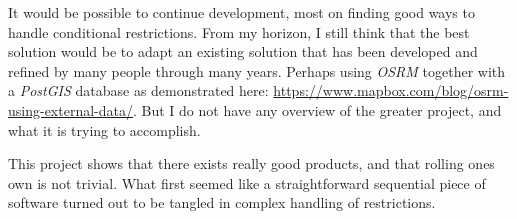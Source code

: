 \documentclass[../main.tex]{subfiles}
\begin{document}
It would be possible to continue development, most on finding good ways to handle conditional restrictions. From my horizon, I still think that the best solution would be to adapt an existing solution that has been developed and refined by many people through many years. Perhaps using \textit{OSRM} together with a \textit{PostGIS} database as demonstrated here: \url{https://www.mapbox.com/blog/osrm-using-external-data/}. But I do not have any overview of the greater project, and what it is trying to accomplish.

This project shows that there exists really good products, and that rolling ones own is not trivial. What first seemed like a straightforward sequential piece of software turned out to be tangled in complex handling of restrictions.
\end{document}
